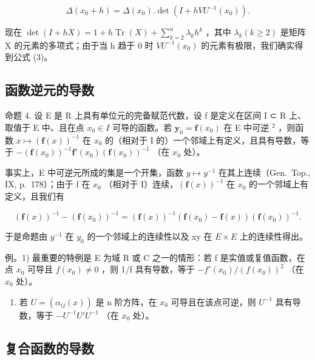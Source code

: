 \[
\Delta (x _ {0} + h) = \Delta (x _ {0}). \det (I + h V U ^ {- 1} (x _ {0})).
\]

现在 \(\det(I + hX) = 1 + h\operatorname{Tr}(X) + \sum_{k=2}^{n} \lambda_k h^k\) ，其中 \(\lambda_k (k \geqslant 2)\) 是矩阵 X 的元素的多项式；由于当 h 趋于 0 时 \(VU^{-1}(x_0)\) 的元素有极限，我们确实得到公式 (3)。

\subsection{函数逆元的导数}

命题 4. 设 E 是 R 上具有单位元的完备赋范代数，设 f 是定义在区间 I ⊂ R 上、取值于 E 中、且在点 \(x_{0} \in I\) 可导的函数。若 \(\mathbf{y}_{0} = \mathbf{f}(x_{0})\) 在 E 中可逆 \(^{2}\) ，则函数 \(x \mapsto (\mathbf{f}(x))^{-1}\) 在 \(x_{0}\) 的（相对于 I 的）一个邻域上有定义，且具有导数，等于 \(-\left(\mathbf{f}(x_{0})\right)^{-1}\mathbf{f}'(x_{0})\left(\mathbf{f}(x_{0})\right)^{-1}\) （在 \(x_{0}\) 处）。

事实上，E 中可逆元所成的集是一个开集，函数 \(y \mapsto y^{-1}\) 在其上连续（Gen.~Top., IX, p.~178）；由于 f 在 \(x_{0}\) （相对于 I）连续，\(\left(\mathbf{f}(x)\right)^{-1}\) 在 \(x_{0}\) 的一个邻域上有定义，且我们有

\[
\left(\mathbf {f} (x)\right) ^ {- 1} - \left(\mathbf {f} \left(x _ {0}\right)\right) ^ {- 1} = \left(\mathbf {f} (x)\right) ^ {- 1} \left(\mathbf {f} \left(x _ {0}\right) - \mathbf {f} (x)\right) \left(\mathbf {f} \left(x _ {0}\right)\right) ^ {- 1}.
\]

于是命题由 \(y^{-1}\) 在 \(y_{0}\) 的一个邻域上的连续性以及 xy 在 \(E \times E\) 上的连续性得出。

例。1) 最重要的特例是 E 为域 R 或 C 之一的情形：若 f 是实值或复值函数，在点 \(x_{0}\) 可导且 \(f(x_{0}) \neq 0\) ，则 1/f 具有导数，等于 \(-f'(x_{0})/(f(x_{0}))^{2}\) （在 \(x_{0}\) 处）。

\begin{enumerate}
\def\labelenumi{\arabic{enumi})}
\setcounter{enumi}{1}
\tightlist
\item
  若 \(U = (\alpha_{ij}(x))\) 是 n 阶方阵，在 \(x_{0}\) 可导且在该点可逆，则 \(U^{-1}\) 具有导数，等于 \(-U^{-1}U'U^{-1}\) （在 \(x_{0}\) 处）。
\end{enumerate}

\subsection{复合函数的导数}

